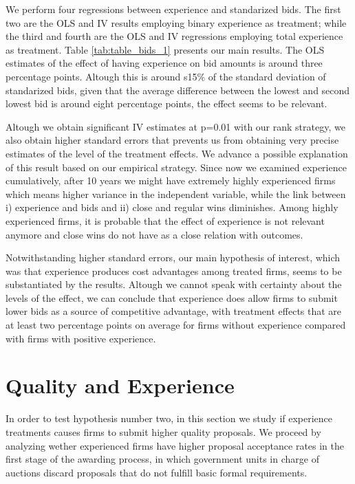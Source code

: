 We perform four regressions between experience and standarized bids. The first two are the OLS and IV results employing binary experience as treatment; while the third and fourth are the OLS and IV regressions employing total experience as treatment. Table \ref{tab:table_bids_1} presents our main results. The OLS estimates of the effect of having experience on bid amounts is around three percentage points. Altough this is around s15\% of the standard deviation of standarized bids, given that the average difference between the lowest and second lowest bid is around eight percentage points, the effect seems to be relevant.

Altough we obtain significant IV estimates at p=0.01 with our rank strategy, we also obtain higher standard errors that prevents us from obtaining very precise estimates of the level of the treatment effects. We advance a possible explanation of this result based on our empirical strategy. Since now we examined experience cumulatively, after 10 years we might have extremely highly experienced firms which means higher variance in the independent variable, while the link between i) experience and bids and ii) close and regular wins diminishes. Among highly experienced firms, it is probable that the effect of experience is not relevant anymore and close wins do not have as a close relation with outcomes.



Notwithstanding higher standard errors, our main hypothesis of interest, which was that experience produces cost advantages among treated firms, seems to be substantiated by the results. Altough we cannot speak with certainty about the levels of the effect, we can conclude that experience does allow firms to submit lower bids as a source of competitive advantage, with treatment effects that are at least two percentage points on average for firms without experience compared with firms with positive experience.


\section{Quality and Experience}
\label{section:qualityexp}
In order to test hypothesis number two, in this section we study if experience treatments causes firms to submit higher quality proposals. We proceed by analyzing wether experienced firms have higher proposal acceptance rates in the first stage of the awarding process, in which government units in charge of auctions discard proposals that do not fulfill basic formal requirements.

